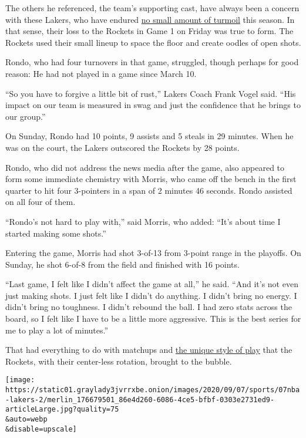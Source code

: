 The others he referenced, the team's supporting cast, have always been a
concern with these Lakers, who have endured
\href{https://www.nytimes3xbfgragh.onion/2020/08/16/sports/basketball/lakers-clippers-nba-playoffs.html}{no
small amount of turmoil} this season. In that sense, their loss to the
Rockets in Game 1 on Friday was true to form. The Rockets used their
small lineup to space the floor and create oodles of open shots.

Rondo, who had four turnovers in that game, struggled, though perhaps
for good reason: He had not played in a game since March 10.

``So you have to forgive a little bit of rust,'' Lakers Coach Frank
Vogel said. ``His impact on our team is measured in swag and just the
confidence that he brings to our group.''

On Sunday, Rondo had 10 points, 9 assists and 5 steals in 29 minutes.
When he was on the court, the Lakers outscored the Rockets by 28 points.

Rondo, who did not address the news media after the game, also appeared
to form some immediate chemistry with Morris, who came off the bench in
the first quarter to hit four 3-pointers in a span of 2 minutes 46
seconds. Rondo assisted on all four of them.

``Rondo's not hard to play with,'' said Morris, who added: ``It's about
time I started making some shots.''

Entering the game, Morris had shot 3-of-13 from 3-point range in the
playoffs. On Sunday, he shot 6-of-8 from the field and finished with 16
points.

``Last game, I felt like I didn't affect the game at all,'' he said.
``And it's not even just making shots. I just felt like I didn't do
anything. I didn't bring no energy. I didn't bring no toughness. I
didn't rebound the ball. I had zero stats across the board, so I felt
like I have to be a little more aggressive. This is the best series for
me to play a lot of minutes.''

That had everything to do with matchups and
\href{https://www.nytimes3xbfgragh.onion/2020/09/03/sports/the-rockets-small-ball-strategy-gets-a-big-test-against-the-lakers.html}{the
unique style of play} that the Rockets, with their center-less rotation,
brought to the bubble.

\texttt{[image: https://static01.graylady3jvrrxbe.onion/images/2020/09/07/sports/07nba-lakers-2/merlin\_176679501\_86e4d260-6086-4ce5-bfbf-0303e2731ed9-articleLarge.jpg?quality=75\\\&auto=webp\\\&disable=upscale]}

